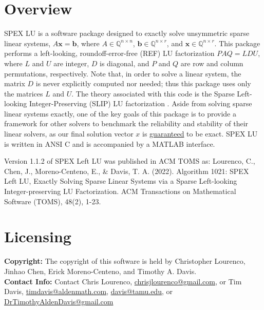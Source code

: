 \documentclass[12pt,oneside]{book}
\theoremstyle{definition}
\renewcommand{\b}{\mathbf{b}}
\newcommand{\x}{\mathbf{x}}
\begin{document}
\section{Overview} \label{s:LeftLU:intro}
SPEX LU is a software package designed to exactly solve unsymmetric sparse
linear systems, $ A \x = \b$, where $A \in \mathbb{Q}^{n \times
n}$, $\b \in \mathbb{Q}^{n \times r}$, and $\x \in \mathbb{Q}^{n \times
r}$. This package performs a left-looking, roundoff-error-free (REF) LU
factorization $P A Q = L D U$, where $L$ and $U$ are integer, $D$ is diagonal,
and $P$ and $Q$ are row and column permutations, respectively. 
Note that, in order to solve a linear system, the matrix $D$ is never explicitly computed nor needed; thus this 
package uses only the matrices $L$ and $U$. The theory associated with this code is the Sparse Left-looking Integer-Preserving (SLIP) LU factorization
 \cite{lourenco2019exact}. Aside from
solving sparse linear systems exactly, one of the key goals of this package is
to provide a framework for other solvers to benchmark the reliability and
stability of their linear solvers, as our final solution vector $x$ is
\ul{guaranteed} to be exact. SPEX LU is written in ANSI C and is accompanied by a MATLAB interface.

Version 1.1.2 of SPEX Left LU was published in ACM TOMS as:
Lourenco, C., Chen, J., Moreno-Centeno, E., \& Davis, T. A. (2022). Algorithm 1021: SPEX Left LU, Exactly Solving Sparse Linear Systems via a Sparse Left-looking Integer-preserving LU Factorization. ACM Transactions on Mathematical Software (TOMS), 48(2), 1-23.


\section{Licensing} \label{s:LeftLU:licensing}
\textbf{Copyright:} The copyright of this software is held by  Christopher Lourenco, Jinhao Chen, Erick Moreno-Centeno, and Timothy A. Davis.\\

\noindent \textbf{Contact Info:} Contact Chris Lourenco,
\href{mailto:chrisjlourenco@gmail.com}{chrisjlourenco@gmail.com}, or Tim Davis,
\href{mailto:timdavis@aldenmath.com}{timdavis@aldenmath.com},
\href{mailto:davis@tamu.edu}{davis@tamu.edu}, or
\href{DrTimothyAldenDavis@gmail.com}{DrTimothyAldenDavis@gmail.com}\\
\end{document}
